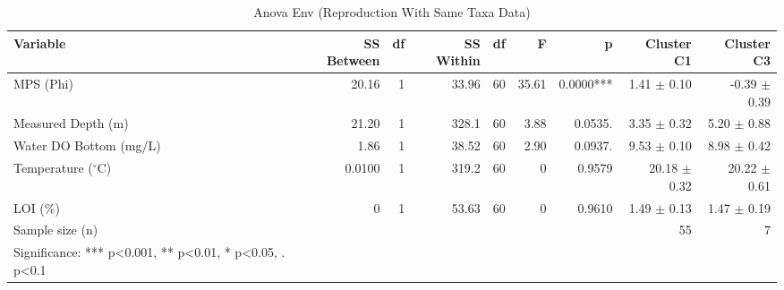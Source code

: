 \begin{table}[htbp]
  \centering
  \caption{Anova Env (Reproduction With Same Taxa Data)}
  \label{tab:reproduction_with_same_taxa_data_tables_anova_env}
  \small
  \begin{tabular}{lrrrrrrrr}
    \toprule
    Variable & SS Between & df & SS Within & df  & F & p & Cluster C1 & Cluster C3 \\
    \midrule
    MPS (Phi) & 20.16 & 1 & 33.96 & 60 & 35.61 & 0.0000*** & 1.41 $\pm$ 0.10 & -0.39 $\pm$ 0.39 \\
    Measured Depth (m) & 21.20 & 1 & 328.1 & 60 & 3.88 & 0.0535. & 3.35 $\pm$ 0.32 & 5.20 $\pm$ 0.88 \\
    Water DO Bottom (mg/L) & 1.86 & 1 & 38.52 & 60 & 2.90 & 0.0937. & 9.53 $\pm$ 0.10 & 8.98 $\pm$ 0.42 \\
    Temperature ($^{\circ}$C) & 0.0100 & 1 & 319.2 & 60 & 0 & 0.9579 & 20.18 $\pm$ 0.32 & 20.22 $\pm$ 0.61 \\
    LOI (\%) & 0 & 1 & 53.63 & 60 & 0 & 0.9610 & 1.49 $\pm$ 0.13 & 1.47 $\pm$ 0.19 \\
    Sample size (n) &  &  &  &  &  &  & 55 & 7 \\
    Significance: *** p<0.001, ** p<0.01, * p<0.05, . p<0.1 &  &  &  &  &  &  &  &  \\
    \bottomrule
  \end{tabular}
\end{table}

